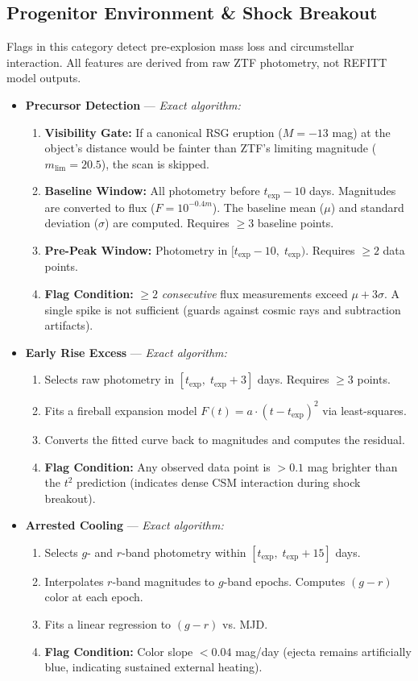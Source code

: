 \documentclass[11pt,a4paper]{article}
\begin{document}
\subsection*{Progenitor Environment \& Shock Breakout}
Flags in this category detect pre-explosion mass loss and circumstellar interaction. All features are derived from raw ZTF photometry, not REFITT model outputs.
\begin{itemize}
    \item \textbf{Precursor Detection} --- \textit{Exact algorithm:}
    \begin{enumerate}
        \item \textbf{Visibility Gate:} If a canonical RSG eruption ($M = -13$ mag) at the object's distance would be fainter than ZTF's limiting magnitude ($m_{\text{lim}} = 20.5$), the scan is skipped.
        \item \textbf{Baseline Window:} All photometry before $t_{\exp} - 10$ days. Magnitudes are converted to flux ($F = 10^{-0.4m}$). The baseline mean ($\mu$) and standard deviation ($\sigma$) are computed. Requires $\ge 3$ baseline points.
        \item \textbf{Pre-Peak Window:} Photometry in $[t_{\exp} - 10, \; t_{\exp})$. Requires $\ge 2$ data points.
        \item \textbf{Flag Condition:} $\ge 2$ \textit{consecutive} flux measurements exceed $\mu + 3\sigma$. A single spike is not sufficient (guards against cosmic rays and subtraction artifacts).
    \end{enumerate}

    \item \textbf{Early Rise Excess} --- \textit{Exact algorithm:}
    \begin{enumerate}
        \item Selects raw photometry in $[t_{\exp}, \; t_{\exp} + 3]$ days. Requires $\ge 3$ points.
        \item Fits a fireball expansion model $F(t) = a \cdot (t - t_{\exp})^2$ via least-squares.
        \item Converts the fitted curve back to magnitudes and computes the residual.
        \item \textbf{Flag Condition:} Any observed data point is $> 0.1$ mag brighter than the $t^2$ prediction (indicates dense CSM interaction during shock breakout).
    \end{enumerate}

    \item \textbf{Arrested Cooling} --- \textit{Exact algorithm:}
    \begin{enumerate}
        \item Selects $g$- and $r$-band photometry within $[t_{\exp}, \; t_{\exp} + 15]$ days.
        \item Interpolates $r$-band magnitudes to $g$-band epochs. Computes $(g-r)$ color at each epoch.
        \item Fits a linear regression to $(g-r)$ vs. MJD.
        \item \textbf{Flag Condition:} Color slope $< 0.04$ mag/day (ejecta remains artificially blue, indicating sustained external heating).
    \end{enumerate}
\end{itemize}
\end{document}
